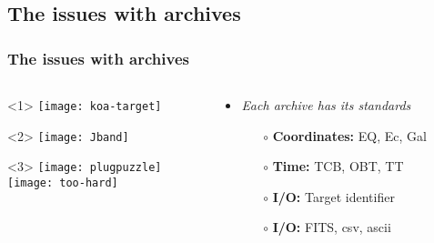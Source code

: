\subsection{The issues with archives}
\begin{frame}
  \frametitle{The issues with archives}

  \begin{columns}[T]

    \begin{column}{.5\textwidth}
      \begin{overlayarea}{\textwidth}{\textheight}

        \begin{onlyenv}<1>
          \vspace{1em}
          \texttt{[image: koa-target]}\\
        \end{onlyenv}
    
        \begin{onlyenv}<2>
          \vspace{2.5em}
          \texttt{[image: Jband]}\\
        \end{onlyenv}
    
        \begin{onlyenv}<3>
          \hspace{0.15\textwidth}\texttt{[image: plugpuzzle]}\\
          \hspace{0.15\textwidth}\texttt{[image: too-hard]}

        \end{onlyenv}

      \end{overlayarea}
    \end{column}

    \begin{column}{.6\textwidth}
      \begin{itemize}[<+->]
        \item \emph{Each archive has its standards}
          \begin{itemize}[<.->]
            \item[$\circ$] \textbf{Coordinates:} EQ, Ec, Gal
            \item[$\circ$] \textbf{Time:} TCB, OBT, TT
            \item[$\circ$] \textbf{I/O:} Target identifier
            \item[$\circ$] \textbf{I/O:} FITS, csv, ascii
          \end{itemize}


\end{itemize}
\end{column}
\end{columns}
\end{frame}
